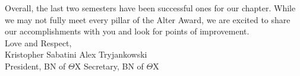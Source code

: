 Overall, the last two semesters have been successful ones for our chapter. While we may not fully meet every pillar of the Alter Award, we are excited to share our accomplishments with you and look for points of improvement. \\

Love and Respect, \\
Kristopher Sabatini \hfill Alex Tryjankowski \\ 
President, BN of $\Theta$X \hfill Secretary, BN of $\Theta$X \\
